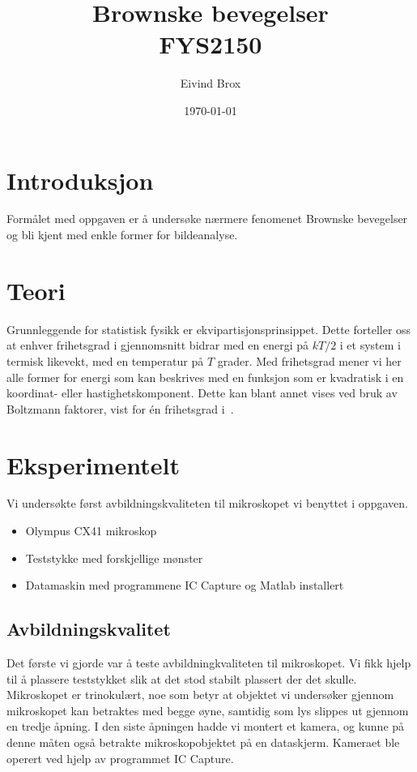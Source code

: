 \documentclass[a4paper,11pt, twocolumn]{article}
\title{Brownske bevegelser \\ FYS2150}
\author{Eivind Brox}
\date{\today}
\begin{document}
\maketitle

\begin{abstract}
\end{abstract}

\section{Introduksjon}
Formålet med oppgaven er å undersøke nærmere fenomenet Brownske bevegelser og bli kjent med enkle former for bildeanalyse.
\section{Teori}
Grunnleggende for statistisk fysikk er ekvipartisjonsprinsippet. Dette forteller oss at enhver frihetsgrad i gjennomsnitt bidrar med en energi på $kT/2$ i et system i termisk likevekt, med en temperatur på $T$ grader. Med frihetsgrad mener vi her alle former for energi som kan beskrives med en funksjon som er kvadratisk i en koordinat- eller hastighetskomponent. Dette kan blant annet vises ved bruk av Boltzmann faktorer, vist for \'en frihetsgrad i~\cite[sek. 6.3]{Schroeder2000}. 
\section{Eksperimentelt}
Vi undersøkte først avbildningskvaliteten til mikroskopet vi benyttet i oppgaven. 
\begin{itemize}
	\item Olympus CX41 mikroskop
	\item Teststykke med forskjellige mønster
	\item Datamaskin med programmene IC Capture og Matlab installert
\end{itemize}

\subsection{Avbildningskvalitet}
Det første vi gjorde var å teste avbildningkvaliteten til mikroskopet. Vi fikk hjelp til å plassere teststykket slik at det stod stabilt plassert der det skulle. Mikroskopet er trinokulært, noe som betyr at objektet vi undersøker gjennom mikroskopet kan betraktes med begge øyne, samtidig som lys slippes ut gjennom en tredje åpning. I den siste åpningen hadde vi montert et kamera, og kunne på denne måten også betrakte mikroskopobjektet på en dataskjerm. Kameraet ble operert ved hjelp av programmet IC Capture.
\end{document}
